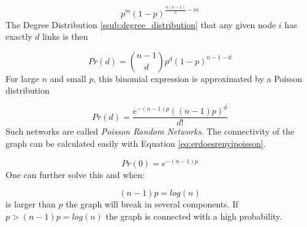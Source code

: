 \begin{equation}
\label{eq:erdoesrenyiprob}
	p^m (1 - p)^{\frac{n(n-1)}{2}-m}
\end{equation}
The Degree Distribution \ref{ssub:degree_distribution}
that any given node $i$ has exactly $d$ links is then

\begin{equation}
\label{eq:erdoesrenyidegreedist}
	Pr(d) = \binom{n-1}{d} p^d(1-p)^{n-1-d}
\end{equation}
For large $n$ and small $p$,
this binomial expression is approximated by a Poisson distribution

\begin{equation}
\label{eq:erdoesrenyipoisson}
	Pr(d) = \frac{e^{-(n-1)p}((n-1)p)^d}{d!}
\end{equation}
Such networks are called \emph{Poisson Random Networks}.
The connectivity of the graph can be calculated easily with Equation \ref{eq:erdoesrenyipoisson}.

\begin{equation}
	Pr(0) = e^{-(n-1)p}
\end{equation}
One can further solve this and when:

\begin{equation}
	(n-1)p= log (n)
\end{equation}
is larger than $p$ the graph will break in several components.
If $p > (n-1)p= log (n)$ the graph is connected with a high probability.


